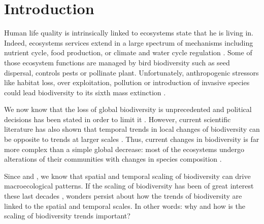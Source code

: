 \documentclass[
  12pt,
  oneside]{report}
\author{François Leroy, PhD student at CZU}
\date{2021-09-23}
\begin{document}


\cleardoublepage 
{}

{
\hypersetup{linkcolor=}
\setcounter{tocdepth}{1}
\tableofcontents
\newpage
}
\vspace{50mm}


\cleardoublepage 
{}


\hypertarget{introduction}{%
\chapter{Introduction}\label{introduction}}

Human life quality is intrinsically linked to ecosystems state that he is living in. Indeed, ecosystems services extend in a large spectrum of mechanisms including nutrient cycle, food production, or climate and water cycle regulation \autocite{pereira_global_2012}. Some of those ecosystem functions are managed by bird biodiversity such as seed dispersal, controls pests or pollinate plant. Unfortunately, anthropogenic stressors like habitat loss, over exploitation, pollution or introduction of invasive species could lead biodiversity to its sixth mass extinction \autocite{barnosky_has_2011}.

We now know that the loss of global biodiversity is unprecedented and political decisions has been stated in order to limit it \autocite[\emph{e.g.}][2010, 2002]{secretariat_of_the_convention_on_biological_diversity_global_2006}. However, current scientific literature has also shown that temporal trends in local changes of biodiversity can be opposite to trends at larger scales \autocite[\emph{e.g.}][]{chase_species_2019}. Thus, current changes in biodiversity is far more complex than a simple global decrease: most of the ecosystems undergo alterations of their communities with changes in species composition \autocite{blowes_geography_2019,dornelas_quantifying_2013,vaidyanathan_worlds_2021}.

Since \textcite{arrhenius_species_1921} and \textcite{grinnell_role_1922}, we know that spatial and temporal scaling of biodiversity can drive macroecological patterns. If the scaling of biodiversity has been of great interest these last decades \autocite[\emph{e.g.}][]{storch_scaling_2007}, wonders persist about how the trends of biodiversity are linked to the spatial and temporal scales. In other words: why and how is the scaling of biodiversity trends important?
\end{document}
